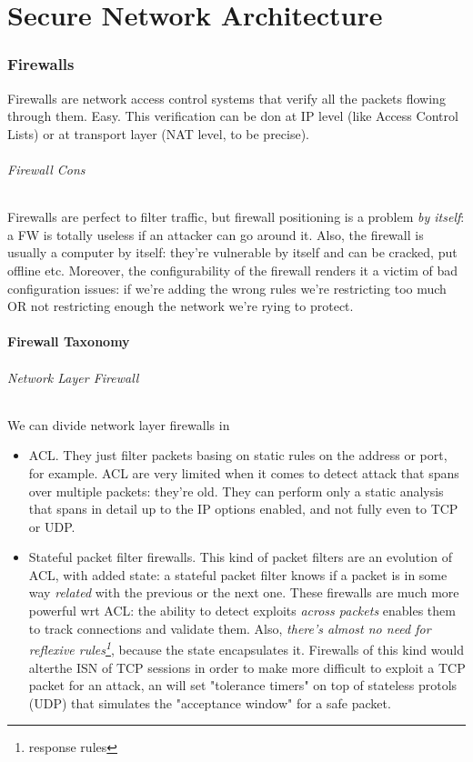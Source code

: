 \documentclass{article}
\begin{document}
	\clearpage \part{Secure Network Architecture}
		\section{Firewalls}
			Firewalls are network access control systems that verify all the packets flowing through them. Easy. This verification can be don at IP level (like Access Control Lists) or at transport layer (NAT level, to be precise).
			
			\paragraph{Firewall Cons}
				Firewalls are perfect to filter traffic, but firewall positioning is a problem \emph{by itself}: a FW is totally useless if an attacker can go around it. Also, the firewall is usually a computer by itself: they're vulnerable by itself and can be cracked, put offline etc. Moreover, the configurability of the firewall renders it a victim of bad configuration issues: if we're adding the wrong rules we're restricting too much OR not restricting enough the network we're rying to protect.
				
			\subsection{Firewall Taxonomy}
				\paragraph{Network Layer Firewall}
					We can divide network layer firewalls in
					\begin{itemize}
						\item ACL. They just filter packets basing on static rules on the address or port, for example. ACL are very limited when it comes to detect attack that spans over multiple packets: they're old. They can perform only a static analysis that spans in detail up to the IP options enabled, and not fully even to TCP or UDP. 
						\item Stateful packet filter firewalls. This kind of packet filters are an evolution of ACL, with added state: a stateful packet filter knows if a packet is in some way \emph{related} with the previous or the next one. These firewalls are much more powerful wrt ACL: the ability to detect exploits \emph{across packets} enables them to track connections and validate them. Also, \emph{there's almost no need for reflexive rules\footnote{response rules}}, because the state encapsulates it. Firewalls of this kind would alterthe ISN of TCP sessions in order to make more difficult to exploit a TCP packet for an attack, an will set "tolerance timers" on top of stateless protols (UDP) that simulates the "acceptance window" for a safe packet.
					\end{itemize} 
				
\end{document}
